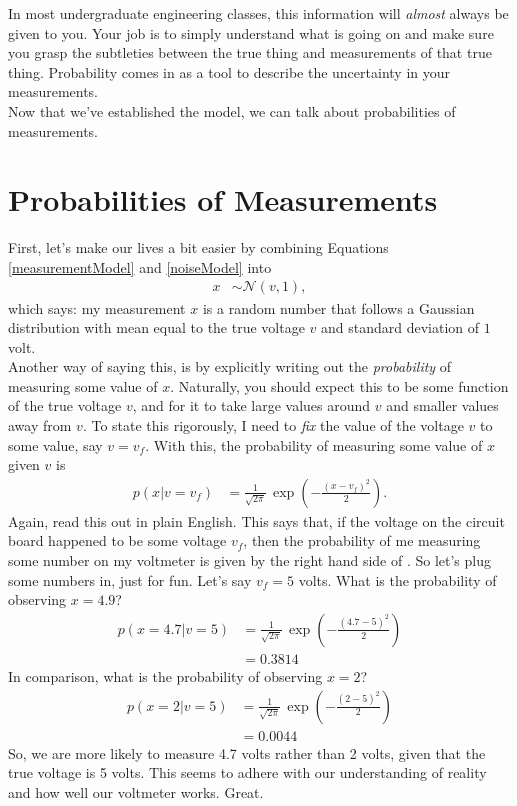 \documentclass[10pt,letterpaper]{article}
\begin{document}
In most undergraduate engineering classes, this information will \emph{almost} always be given to you. Your job is to simply understand what is going on and make sure you grasp the subtleties between the true thing and measurements of that true thing. Probability comes in as a tool to describe the uncertainty in your measurements.\\

Now that we've established the model, we can talk about probabilities of measurements.

\section{Probabilities of Measurements}
First, let's make our lives a bit easier by combining Equations \eqref{measurementModel} and \eqref{noiseModel} into
\begin{align}
	x &\sim \mathcal{N}(v,1),
\end{align}
which says: my measurement $x$ is a random number that follows a Gaussian distribution with mean equal to the true voltage $v$ and standard deviation of $1$ volt.\\

Another way of saying this, is by explicitly writing out the \emph{probability} of measuring some value of $x$. Naturally, you should expect this to be some function of the true voltage $v$, and for it to take large values around $v$ and smaller values away from $v$. To state this rigorously, I need to \emph{fix} the value of the voltage $v$ to some value, say $v = v_f$. With this, the probability of measuring some value of $x$ given $v$ is
\begin{align}
	p(x \vert v=v_f) &= \frac{1}{\sqrt{2\pi}}\,\exp\left( -\frac{(x-v_f)^2}{2} \right) \label{prob}.
\end{align}
Again, read this out in plain English. This says that, if the voltage on the circuit board happened to be some voltage $v_f$, then the probability of me measuring some number on my voltmeter is given by the right hand side of . So let's plug some numbers in, just for fun. Let's say $v_f = 5$ volts. What is the probability of observing $x=4.9$?
\begin{align}
	p(x=4.7 \vert v = 5) &= \frac{1}{\sqrt{2\pi}}\,\exp\left(-\frac{(4.7-5)^2}{2} \right)\\
						 &= 0.3814
\end{align}
In comparison, what is the probability of observing $x=2$?
\begin{align}
	p(x=2 \vert v = 5) &= \frac{1}{\sqrt{2\pi}}\,\exp\left(-\frac{(2-5)^2}{2} \right)\\
						 &= 0.0044
\end{align}
So, we are more likely to measure 4.7 volts rather than 2 volts, given that the true voltage is 5 volts. This seems to adhere with our understanding of reality and how well our voltmeter works. Great.\\
\end{document}
